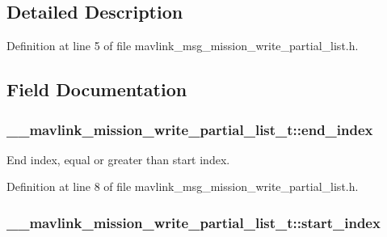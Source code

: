 \subsection{Detailed Description}


Definition at line 5 of file mavlink\-\_\-msg\-\_\-mission\-\_\-write\-\_\-partial\-\_\-list.\-h.



\subsection{Field Documentation}
\hypertarget{struct____mavlink__mission__write__partial__list__t_a98971b77ca596d8a92837a0836abf489}{
\subsubsection[{end\-\_\-index}]{ \-\_\-\-\_\-mavlink\-\_\-mission\-\_\-write\-\_\-partial\-\_\-list\-\_\-t\-::end\-\_\-index}}\label{struct____mavlink__mission__write__partial__list__t_a98971b77ca596d8a92837a0836abf489}


End index, equal or greater than start index. 



Definition at line 8 of file mavlink\-\_\-msg\-\_\-mission\-\_\-write\-\_\-partial\-\_\-list.\-h.

\hypertarget{struct____mavlink__mission__write__partial__list__t_a7001c48ce5da88acadbcbe40a56a0e43}{
\subsubsection[{start\-\_\-index}]{ \-\_\-\-\_\-mavlink\-\_\-mission\-\_\-write\-\_\-partial\-\_\-list\-\_\-t\-::start\-\_\-index}}\label{struct____mavlink__mission__write__partial__list__t_a7001c48ce5da88acadbcbe40a56a0e43}


